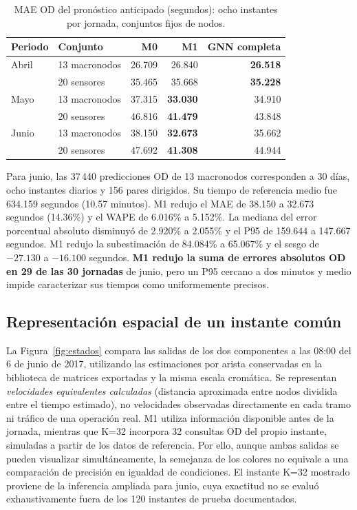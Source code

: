 \documentclass[letterpaper,11pt]{article}
\begin{document}
\begin{table}[htbp]\centering\small
\caption{MAE OD del pronóstico anticipado (segundos): ocho instantes por jornada, conjuntos fijos de nodos.}\label{tab:predod}
\begin{tabular}{@{}llrrr@{}}\toprule
Periodo & Conjunto & M0 & M1 & GNN completa \\ \midrule
Abril & 13 macronodos & 26.709 & 26.840 & \textbf{26.518} \\
 & 20 sensores & 35.465 & 35.668 & \textbf{35.228} \\
Mayo & 13 macronodos & 37.315 & \textbf{33.030} & 34.910 \\
 & 20 sensores & 46.816 & \textbf{41.479} & 43.848 \\
Junio & 13 macronodos & 38.150 & \textbf{32.673} & 35.662 \\
 & 20 sensores & 47.692 & \textbf{41.308} & 44.944 \\ \bottomrule
\end{tabular}
\end{table}

Para junio, las 37\,440 predicciones OD de 13 macronodos corresponden a 30 días, ocho instantes diarios y 156 pares dirigidos. Su tiempo de referencia medio fue 634.159 segundos (10.57 minutos). M1 redujo el MAE de 38.150 a 32.673 segundos (14.36\%) y el WAPE de 6.016\% a 5.152\%. La mediana del error porcentual absoluto disminuyó de 2.920\% a 2.055\% y el P95 de 159.644 a 147.667 segundos. M1 redujo la subestimación de 84.084\% a 65.067\% y el sesgo de $-27.130$ a $-16.100$ segundos. \textbf{M1 redujo la suma de errores absolutos OD en 29 de las 30 jornadas} de junio, pero un P95 cercano a dos minutos y medio impide caracterizar sus tiempos como uniformemente precisos.

\subsection{Representación espacial de un instante común}
La Figura~\ref{fig:estados} compara las salidas de los dos componentes a las 08:00 del 6 de junio de 2017, utilizando las estimaciones por arista conservadas en la biblioteca de matrices exportadas y la misma escala cromática. Se representan \emph{velocidades equivalentes calculadas} (distancia aproximada entre nodos dividida entre el tiempo estimado), no velocidades observadas directamente en cada tramo ni tráfico de una operación real. M1 utiliza información disponible antes de la jornada, mientras que K=32 incorpora 32 consultas OD del propio instante, simuladas a partir de los datos de referencia. Por ello, aunque ambas salidas se pueden visualizar simultáneamente, la semejanza de los colores no equivale a una comparación de precisión en igualdad de condiciones. El instante K=32 mostrado proviene de la inferencia ampliada para junio, cuya exactitud no se evaluó exhaustivamente fuera de los 120 instantes de prueba documentados.
\end{document}
